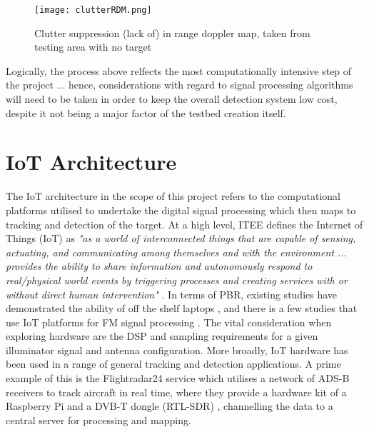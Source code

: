 \begin{figure}[htbp]
    \centering
    \texttt{[image: clutterRDM.png]}
    \caption{Clutter suppression (lack of) in range doppler map, taken from testing area with no target}
    \label{fig:clutter}
\end{figure}


\noindent Logically, the process above relfects the most computationally intensive step of the project ... hence, considerations with regard to signal processing algorithms will need to be taken in order to keep the overall detection system low cost, despite it not being a major factor of the testbed creation itself. 


\section{IoT Architecture}

The IoT architecture in the scope of this project refers to the computational platforms utilised to undertake the digital signal processing which then maps to tracking and detection of the target. At a high level, ITEE defines the Internet of Things (IoT) as \textit{"as a world of interconnected things that are capable of sensing, actuating, and communicating among themselves and with the environment ... provides the ability to share information and autonomously respond to real/physical world events by triggering processes and creating services with or without direct human intervention"} \cite{IoTdefinition}. In terms of PBR, existing studies have demonstrated the ability of off the shelf laptops \cite{FMlowCost}, and there is a few studies that use IoT platforms for FM signal processing \cite{IOTpassiveRadar}. The vital consideration when exploring hardware are the DSP and sampling requirements for a given illuminator signal and antenna configuration. More broadly, IoT hardware has been used in a range of general tracking and detection applications. A prime example of this is the Flightradar24 service which utilises a network of ADS-B receivers to track aircraft in real time, where they provide a hardware kit of a Raspberry Pi and a DVB-T dongle (RTL-SDR) \cite{flightradar24}, channelling the data to a central server for processing and mapping. 

